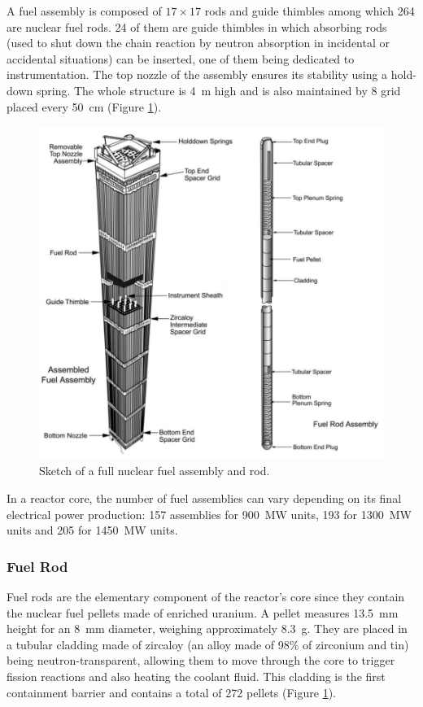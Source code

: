A fuel assembly is composed of $17 \times 17$ rods and guide thimbles among which 264 are nuclear fuel rods. 24 of them are guide thimbles in which absorbing rods (used to shut down the chain reaction by neutron absorption in incidental or accidental situations) can be inserted, one of them being dedicated to instrumentation. The top nozzle of the assembly ensures its stability using a hold-down spring. The whole structure is 4\ m high and is also maintained by 8 grid placed every 50\ cm (Figure \ref{fig:fuel_assembly}). 




\begin{figure}[!h]
\centering
\includegraphics[width=0.7\linewidth]{img/intro/fuel_assembly.png}
\caption{Sketch of a full nuclear fuel assembly and rod. \cite{Croff_nuclear_fuel}}
\label{fig:fuel_assembly}
\end{figure}

\npar

In a reactor core, the number of fuel assemblies can vary depending on its final electrical power production: 157 assemblies for 900\ MW units, 193 for 1300~MW units and 205 for 1450~MW units.

\subsubsection{Fuel Rod}

Fuel rods are the elementary component of the reactor's core since they contain the nuclear fuel pellets made of enriched uranium. A pellet measures 13.5\ mm height for an 8\ mm diameter, weighing approximately 8.3\ g. They are placed in a tubular cladding made of zircaloy (an alloy made of 98\% of zirconium and tin) being neutron-transparent, allowing them to move through the core to trigger fission reactions and also heating the coolant fluid. This cladding is the first containment barrier and contains a total of 272 pellets (Figure \ref{fig:fuel_assembly}).

